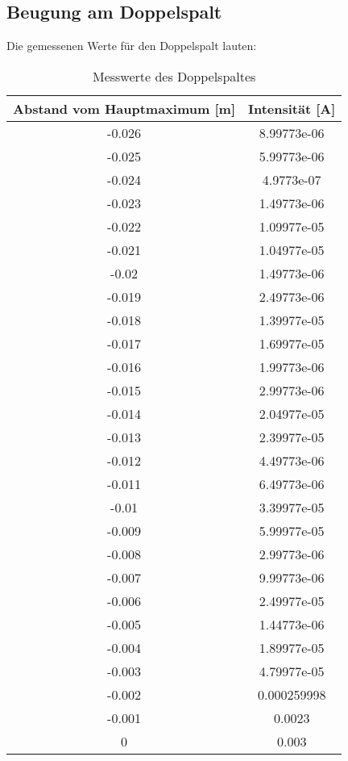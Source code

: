 \subsection{Beugung am Doppelspalt}
  Die gemessenen Werte für den Doppelspalt lauten:
  \begin{table}[H]
    \centering
    \caption{Messwerte des Doppelspaltes}
    \label{tab:mag}
    \begin{tabular}{c c}
     \toprule
      Abstand vom Hauptmaximum [m] & Intensität [A]\\
     \midrule
  -0.026       & 8.99773e-06 \\
 -0.025       & 5.99773e-06 \\
 -0.024       & 4.9773e-07  \\
 -0.023       & 1.49773e-06 \\
 -0.022       & 1.09977e-05 \\
 -0.021       & 1.04977e-05 \\
 -0.02        & 1.49773e-06 \\
 -0.019       & 2.49773e-06 \\
 -0.018       & 1.39977e-05 \\
 -0.017       & 1.69977e-05 \\
 -0.016       & 1.99773e-06 \\
 -0.015       & 2.99773e-06 \\
 -0.014       & 2.04977e-05 \\
 -0.013       & 2.39977e-05 \\
 -0.012       & 4.49773e-06 \\
 -0.011       & 6.49773e-06 \\
 -0.01        & 3.39977e-05 \\
 -0.009       & 5.99977e-05 \\
 -0.008       & 2.99773e-06 \\
 -0.007       & 9.99773e-06 \\
 -0.006       & 2.49977e-05 \\
 -0.005       & 1.44773e-06 \\
 -0.004       & 1.89977e-05 \\
 -0.003       & 4.79977e-05 \\
 -0.002       & 0.000259998 \\
 -0.001       & 0.0023      \\
  0           & 0.003       \\
  \bottomrule
  \end{tabular}
  \end{table}
